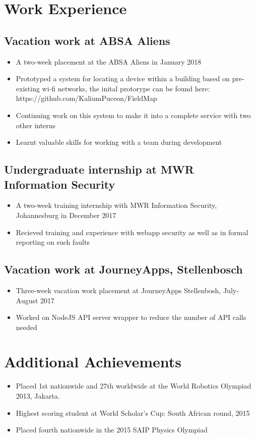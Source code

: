 \documentclass[12pt,a4paper,notitlepage]{article}
\begin{document}
\section*{Work Experience}

\subsection*{Vacation work at ABSA Aliens}
\begin{itemize}
\item A two-week placement at the ABSA Aliens in January 2018
\item Prototyped a system for locating a device within a building based on pre-existing wi-fi networks, the inital protorype can be found here: https://github.com/KaliumPuceon/FieldMap
\item Continuing work on this system to make it into a complete service with two other interns
\item Learnt valuable skills for working with a team during development
\end{itemize}

\subsection*{Undergraduate internship at MWR Information Security}
\begin{itemize}
\item A two-week training internship with MWR Information Security, Johannesburg in December 2017
\item Recieved training and experience with webapp security as well as in formal reporting on such faults
\end{itemize}

\subsection*{Vacation work at JourneyApps, Stellenbosch}
\begin{itemize}
\item Three-week vacation work placement at JourneyApps Stellenbosh, July-August 2017
\item Worked on NodeJS API server wrapper to reduce the number of API calls needed
\end{itemize}

\section*{Additional Achievements}
\begin{itemize}
\item Placed 1st nationwide and 27th worldwide at the World Robotics Olympiad 2013, Jakarta.
\item Highest scoring student at World Scholar's Cup: South African round, 2015
\item Placed fourth nationwide in the 2015 SAIP Physics Olympiad
\end{itemize}
\end{document}
